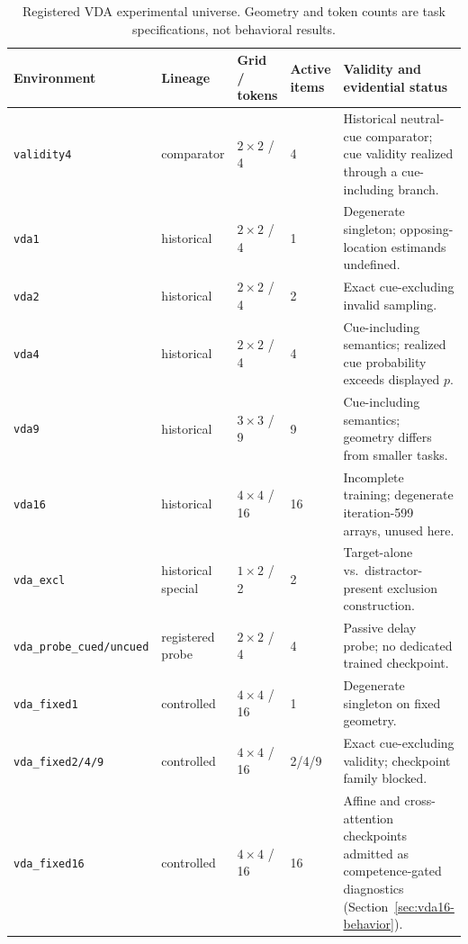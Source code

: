\documentclass[10pt]{article}
\newcommand{\env}[1]{\texttt{#1}}
\begin{document}
\begin{table}[t]
\centering\small
\begin{tabularx}{\textwidth}{@{}l l l l Y@{}}
\toprule
Environment & Lineage & Grid / tokens & Active items & Validity and evidential status\\
\midrule
\env{validity4} & comparator & $2\times2$ / 4 & 4 & Historical neutral-cue comparator; cue validity realized through a cue-including branch.\\
\env{vda1} & historical & $2\times2$ / 4 & 1 & Degenerate singleton; opposing-location estimands undefined.\\
\env{vda2} & historical & $2\times2$ / 4 & 2 & Exact cue-excluding invalid sampling.\\
\env{vda4} & historical & $2\times2$ / 4 & 4 & Cue-including semantics; realized cue probability exceeds displayed $p$.\\
\env{vda9} & historical & $3\times3$ / 9 & 9 & Cue-including semantics; geometry differs from smaller tasks.\\
\env{vda16} & historical & $4\times4$ / 16 & 16 & Incomplete training; degenerate iteration-599 arrays, unused here.\\
\env{vda\_excl} & historical special & $1\times2$ / 2 & 2 & Target-alone vs.\ distractor-present exclusion construction.\\
\env{vda\_probe\_cued/uncued} & registered probe & $2\times2$ / 4 & 4 & Passive delay probe; no dedicated trained checkpoint.\\
\env{vda\_fixed1} & controlled & $4\times4$ / 16 & 1 & Degenerate singleton on fixed geometry.\\
\env{vda\_fixed2/4/9} & controlled & $4\times4$ / 16 & 2/4/9 & Exact cue-excluding validity; checkpoint family blocked.\\
\env{vda\_fixed16} & controlled & $4\times4$ / 16 & 16 & Affine and cross-attention checkpoints admitted as competence-gated diagnostics (Section~\ref{sec:vda16-behavior}).\\
\bottomrule
\end{tabularx}
\caption{Registered VDA experimental universe. Geometry and token counts are task specifications, not behavioral results.}\label{tab:environments}
\end{table}
\end{document}
